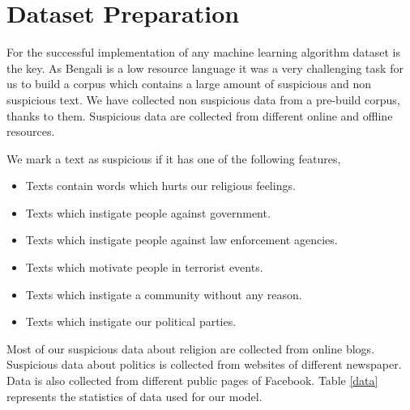 \section{\textbf{Dataset Preparation}}
For the successful implementation of any machine learning algorithm dataset is the key. As Bengali is a low resource language it was a very challenging task for us to build a corpus which contains a large amount of suspicious and non suspicious text. We have collected non suspicious data from a pre-build corpus\cite{banglacorpus}, thanks to them. Suspicious data are collected from different online and offline resources.%
\par \vspace{0.3cm} 
We mark a text as suspicious if it has one of the following features,
\begin{itemize}
    \item Texts contain words which hurts our religious feelings.\vspace{0.2cm} 
    \item Texts which instigate people against government.\vspace{0.2cm} 
    \item Texts which instigate people against law enforcement agencies.\vspace{0.2cm} 
    \item Texts which motivate people in terrorist events.\vspace{0.2cm} 
    \item Texts which instigate a community without any reason.\vspace{0.2cm} 
    \item Texts which instigate our political parties. 
\end{itemize}
 \par \vspace{0.3cm}
 Most of our suspicious data about religion are collected from online blogs\cite{nastikya, dhormo, istishon}. Suspicious data about politics is collected from websites of different newspaper\cite{palo, kk, juga}. Data is also collected from different public pages of Facebook\cite{bash}. Table \ref{data} represents the statistics of data used for our model.
 
